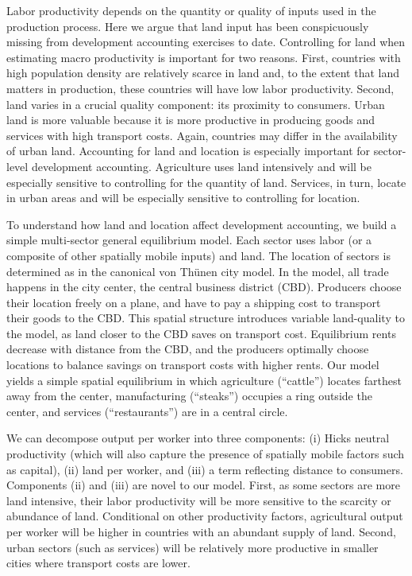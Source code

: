 \documentclass[12pt]{article}
\begin{document}
Labor productivity depends on the quantity or quality of inputs used in the production process. Here we argue that land input has been conspicuously missing from development accounting exercises to date. Controlling for land when estimating macro productivity is important for two reasons. First, countries with high population density are relatively scarce in land and, to the extent that land matters in production, these countries will have low labor productivity. Second, land varies in a crucial quality component: its proximity to consumers. Urban land is more valuable because it is more productive in producing goods and services with high transport costs. Again, countries may differ in the availability of urban land. Accounting for land and location is especially important for sector-level development accounting. Agriculture uses land intensively and will be especially sensitive to controlling for the quantity of land. Services, in turn, locate in urban areas and will be especially sensitive to controlling for location.

To understand how land and location affect development accounting, we build a simple multi-sector general equilibrium model. Each sector uses labor (or a composite of other spatially mobile inputs) and land. The location of sectors is determined as in the canonical von Thünen city model. In the model, all trade happens in the city center, the central business district (CBD). Producers choose their location freely on a plane, and have to pay a shipping cost to transport their goods to the CBD. This spatial structure introduces variable land-quality to the model, as land closer to the CBD saves on transport cost. Equilibrium rents decrease with distance from the CBD, and the producers optimally choose locations to balance savings on transport costs with higher rents. Our model yields a simple spatial equilibrium in which agriculture (``cattle'') locates farthest away from the center, manufacturing (``steaks'') occupies a ring outside the center, and services (``restaurants'') are in a central circle.

We can decompose output per worker into three components: (i) Hicks neutral productivity (which will also capture the presence of spatially mobile factors such as capital), (ii) land per worker, and (iii) a term reflecting distance to consumers. Components (ii) and (iii) are novel to our model. First, as some sectors are more land intensive, their labor productivity will be more sensitive to the scarcity or abundance of land. Conditional on other productivity factors, agricultural output per worker will be higher in countries with an abundant supply of land. Second, urban sectors (such as services) will be relatively more productive in smaller cities where transport costs are lower.
\end{document}
